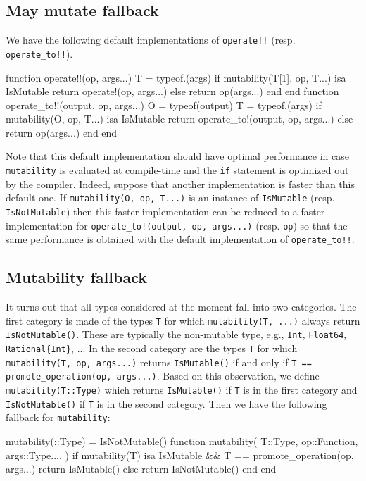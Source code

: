 \documentclass{juliacon}
\begin{document}
\subsection{May mutate fallback}
We have the following default implementations of \lstinline|operate!!| (resp. \lstinline|operate_to!!|).
\begin{jllisting}
function operate!!(op, args...)
    T = typeof.(args)
    if mutability(T[1], op, T...) isa IsMutable
        return operate!(op, args...)
    else
        return op(args...)
    end
end
function operate_to!!(output, op, args...)
    O = typeof(output)
    T = typeof.(args)
    if mutability(O, op, T...) isa IsMutable
        return operate_to!(output, op, args...)
    else
        return op(args...)
    end
end
\end{jllisting}
Note that this default implementation should have optimal performance in case \lstinline|mutability| is evaluated at compile-time and the \lstinline|if| statement is optimized out by the compiler.
Indeed, suppose that
another implementation is faster than this default one.
If \lstinline|mutability(O, op, T...)| is an instance of \lstinline|IsMutable| (resp. \lstinline|IsNotMutable|)
then this faster implementation can be reduced to a faster implementation for \lstinline|operate_to!(output, op, args...)| (resp. \lstinline|op|)
so that the same performance is obtained with the default implementation of \lstinline|operate_to!!|.

\subsection{Mutability fallback}
It turns out that all types considered at the moment fall into two categories.
The first category is made of the types \lstinline|T| for which
\lstinline|mutability(T, ...)| always return \lstinline|IsNotMutable()|.
These are typically the non-mutable type, e.g., \lstinline|Int|, \lstinline|Float64|, \lstinline|Rational{Int}|, ...
In the second category are the types \lstinline|T| for which
\lstinline|mutability(T, op, args...)| returns \lstinline|IsMutable()|
if and only if \lstinline|T == promote_operation(op, args...)|.
Based on this observation, we define \lstinline|mutability(T::Type)| which
returns \lstinline|IsMutable()| if \lstinline|T| is in the first category
and \lstinline|IsNotMutable()| if \lstinline|T| is in the second category.
Then we have the following fallback for \lstinline|mutability|:
\begin{jllisting}
mutability(::Type) = IsNotMutable()
function mutability(
    T::Type,
    op::Function,
    args::Type...,
)
    if mutability(T) isa IsMutable &&
        T == promote_operation(op, args...)
        return IsMutable()
    else
        return IsNotMutable()
    end
end
\end{jllisting}
\end{document}
